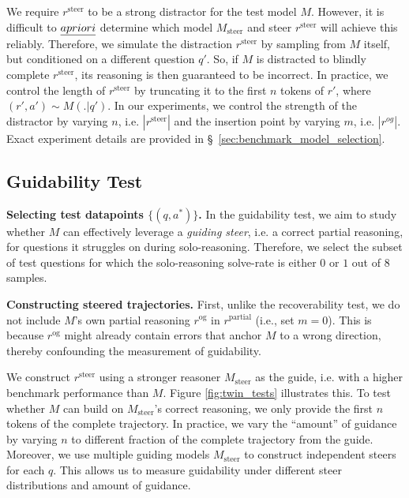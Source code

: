 \documentclass{article} %
\begin{document}
We require $r^\mathrm{steer}$ to be a strong distractor for the test model $M$. However, it is difficult to $\emph{a priori}$ determine which model $M_\mathrm{steer}$ and steer $r^\mathrm{steer}$ will achieve this reliably. Therefore, we simulate the distraction  $r^\mathrm{steer}$ by sampling from $M$ itself, but conditioned on a different question $q'$. So, if $M$ is distracted to blindly complete $r^\mathrm{steer}$, its reasoning is then guaranteed to be incorrect. In practice, we control the length of $r^\mathrm{steer}$ by truncating it to the first $n$ tokens of $r'$, where $(r', a') \sim M(.|q')$.  In our experiments,  we control the strength of the distractor by varying $n$, i.e. $|r^{\mathrm{steer}}|$ and the insertion point by varying $m$, i.e. $|r^{og}|$. Exact experiment details are provided in \S~\ref{sec:benchmark_model_selection}.

\subsection{Guidability Test}
\label{sec:guidability_math}

\textbf{Selecting test datapoints \boldmath$\{(q, a^*)\}$.} In the guidability test, we aim to study whether $M$ can effectively leverage a \emph{guiding steer}, i.e. a correct partial reasoning, for questions it struggles on during solo-reasoning. Therefore, we select the subset of test questions for which the solo-reasoning solve-rate is either $0$ or $1$ out of $8$ samples.  

\textbf{Constructing steered trajectories.} First, unlike the recoverability test, we do not include $M$'s own partial reasoning $r^\mathrm{og}$ in $r^\mathrm{partial}$ (i.e., set $m = 0$). This is because $r^\mathrm{og}$ might already contain errors that anchor $M$ to a wrong direction, thereby confounding the measurement of guidability.

We construct $r^\mathrm{steer}$ using a stronger reasoner $M_\mathrm{steer}$  as the guide, i.e. with a higher benchmark performance than $M$. Figure \ref{fig:twin_tests}   illustrates this. To test whether $M$ can build on $M_\mathrm{steer}$'s correct reasoning, we only provide the first $n$ tokens of the complete trajectory. In practice, we vary the ``amount'' of guidance by varying $n$ to different fraction of the complete trajectory from the guide. Moreover, we use multiple guiding models $M_\mathrm{steer}$ to construct independent steers for each $q$. This allows us to measure guidability under different steer distributions and amount of guidance.  
\end{document}
